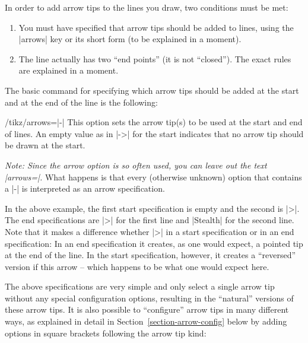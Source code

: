 In order to add arrow tips to the lines you draw, two conditions must
be met:

\begin{enumerate}
\item You must have specified that arrow tips should be added to 
  lines, using the |arrows| key or its short form (to be explained in
  a moment).
\item The line actually has two ``end points'' (it is not
  ``closed''). The exact rules are explained in a moment.
\end{enumerate}

The basic command for specifying which arrow tips should be added at
the start and at the end of the line is the following:

\begin{key}{/tikz/arrows=|-|} 
  This option sets the arrow tip(s) to be used at the start and end of
  lines. An empty value as in |->| for the start indicates that no
  arrow tip should be drawn at the start.%

  \emph{Note: Since the arrow option is so often used, you can leave
    out the text |arrows=|.} What happens is that every (otherwise
  unknown) option that contains a |-| is interpreted as an arrow specification.

\begin{codeexample}[]
\end{codeexample}

  In the above example, the first start specification is empty and the
  second is |>|. The end specifications are |>| for the first line and
  |Stealth| for the second line. Note that it makes a difference
  whether |>| in a start specification or in an end specification: In
  an end specification it creates, as one would expect, a pointed tip
  at the end of the line. In the start specification, however, it
  creates a ``reversed'' version if this arrow -- which happens to be
  what one would expect here.

  The above specifications are very simple and only select a single
  arrow tip without any special configuration options, resulting in
  the ``natural'' versions of these arrow tips. It is also possible to
  ``configure'' arrow tips in many different ways, as explained in
  detail in Section~\ref{section-arrow-config} below by adding options
  in square brackets following the arrow tip kind:


\end{key}
